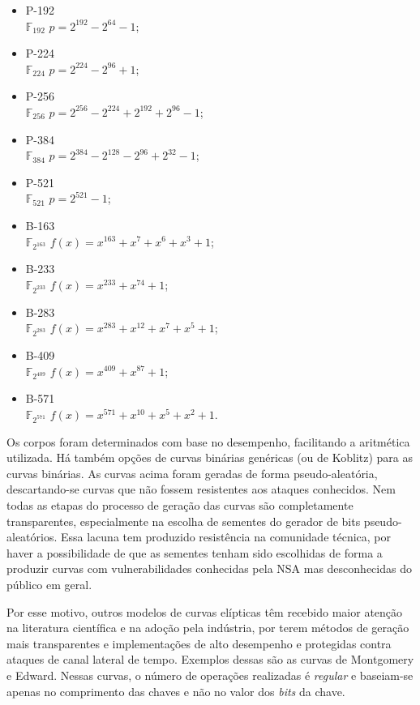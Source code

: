 \documentclass{SBCbookchapter}
\begin{document}
\begin{multicols}{2}
\begin{itemize}
\item P-192 \\ $\mathbb{F}_{192}$ $p = 2^{192} - 2^{64} - 1$; 
\item P-224 \\ $\mathbb{F}_{224}$ $p = 2^{224} - 2^{96} + 1$;
\item P-256 \\ $\mathbb{F}_{256}$ $p = 2^{256} - 2^{224} + 2^{192} + 2^{96} - 1$;
\item P-384 \\ $\mathbb{F}_{384}$ $p = 2^{384} - 2^{128} - 2^{96} + 2^{32} - 1$;
\item P-521 \\ $\mathbb{F}_{521}$ $p = 2^{521} - 1$;
\item B-163 \\ $\mathbb{F}_{2^{163}}$ $f(x) = x^{163} + x^7 + x^6 + x^3 + 1$;
\item B-233 \\ $\mathbb{F}_{2^{233}}$ $f(x) = x^{233} + x^{74} + 1$;
\item B-283 \\ $\mathbb{F}_{2^{283}}$ $f(x) = x^{283} + x^{12} + x^7 + x^5 + 1$;
\item B-409 \\ $\mathbb{F}_{2^{409}}$ $f(x) = x^{409} + x ^{87} + 1$;
\item B-571 \\ $\mathbb{F}_{2^{571}}$ $f(x) = x^{571} + x^{10} + x^5 + x^2 + 1$.
\end{itemize}
\end{multicols}

Os corpos foram determinados com base no desempenho, facilitando a aritmética utilizada. Há também opções de curvas binárias genéricas (ou de Koblitz) para as curvas binárias. As curvas acima foram geradas de forma pseudo-aleatória, descartando-se curvas que não fossem resistentes aos ataques conhecidos. Nem todas as etapas do processo de geração das curvas são completamente transparentes, especialmente na escolha de sementes do gerador de bits pseudo-aleatórios. Essa lacuna tem produzido resistência na comunidade técnica, por haver a possibilidade de que as sementes tenham sido escolhidas de forma a produzir curvas com vulnerabilidades conhecidas pela NSA mas desconhecidas do público em geral.

Por esse motivo, outros modelos de curvas elípticas têm recebido maior atenção na literatura científica e na adoção pela indústria, por terem métodos de geração mais transparentes e implementações de alto desempenho e protegidas contra ataques de canal lateral de tempo. Exemplos dessas são as curvas de Montgomery e Edward. Nessas curvas, o número de operações realizadas é \emph{regular} e baseiam-se apenas no comprimento das chaves e não no valor dos \emph{bits} da chave.
\end{document}

